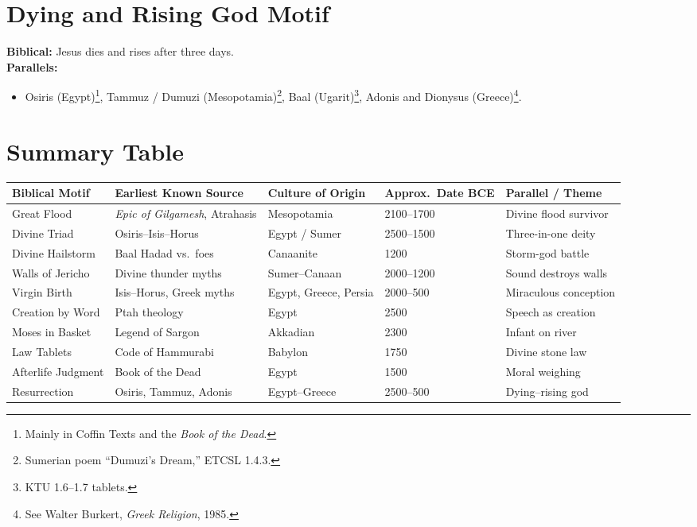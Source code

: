 \documentclass[11pt,a4paper]{article}
\begin{document}
\section{Dying and Rising God Motif}
\textbf{Biblical:} Jesus dies and rises after three days.\\
\textbf{Parallels:}
\begin{itemize}
  \item Osiris (Egypt)\footnote{Mainly in Coffin Texts and the \emph{Book of the Dead}.}, Tammuz / Dumuzi (Mesopotamia)\footnote{Sumerian poem “Dumuzi’s Dream,” ETCSL 1.4.3.}, Baal (Ugarit)\footnote{KTU 1.6–1.7 tablets.}, Adonis and Dionysus (Greece)\footnote{See Walter Burkert, \emph{Greek Religion}, 1985.}.
\end{itemize}

\newpage
\section{Summary Table}
\renewcommand{\arraystretch}{1.2}
\begin{longtable}{>{\raggedright}p{3.3cm} >{\raggedright}p{3.8cm} >{\raggedright}p{3cm} >{\raggedright}p{2cm} >{\raggedright\arraybackslash}p{4cm}}
\toprule
\textbf{Biblical Motif} & \textbf{Earliest Known Source} & \textbf{Culture of Origin} & \textbf{Approx.\ Date BCE} & \textbf{Parallel / Theme} \\
\midrule
Great Flood & \emph{Epic of Gilgamesh}, Atrahasis & Mesopotamia & 2100–1700 & Divine flood survivor \\
Divine Triad & Osiris–Isis–Horus & Egypt / Sumer & 2500–1500 & Three-in-one deity \\
Divine Hailstorm & Baal Hadad vs.\ foes & Canaanite & 1200 & Storm-god battle \\
Walls of Jericho & Divine thunder myths & Sumer–Canaan & 2000–1200 & Sound destroys walls \\
Virgin Birth & Isis–Horus, Greek myths & Egypt, Greece, Persia & 2000–500 & Miraculous conception \\
Creation by Word & Ptah theology & Egypt & 2500 & Speech as creation \\
Moses in Basket & Legend of Sargon & Akkadian & 2300 & Infant on river \\
Law Tablets & Code of Hammurabi & Babylon & 1750 & Divine stone law \\
Afterlife Judgment & Book of the Dead & Egypt & 1500 & Moral weighing \\
Resurrection & Osiris, Tammuz, Adonis & Egypt–Greece & 2500–500 & Dying–rising god \\
\bottomrule
\end{longtable}
\end{document}
